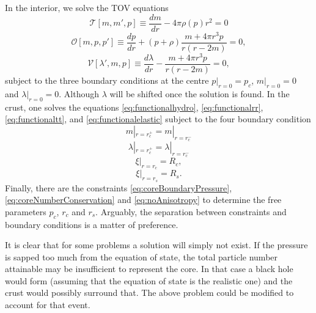 In the interior, we solve the TOV equations
\begin{equation}
\mathcal{T}[m,m',p] \equiv \frac{dm}{dr} - 4\pi\rho(p) r^2=0
\label{eq:tovrr}
\end{equation}
\begin{equation}
\mathcal{O}[m,p,p'] \equiv \frac{dp}{dr} + (p+\rho)\frac{m+4\pi r^3p}{r(r-2m)} = 0,
\label{eq:tovhydro}
\end{equation}
\begin{equation}
\mathcal{V}[\lambda',m,p] \equiv \frac{d\lambda}{dr} - \frac{m+4\pi r^3p}{r(r-2m)} = 0,
\label{eq:tovtt}
\end{equation}
subject to the three boundary conditions at the centre $p|_{r=0} = p_c$, $m|_{r=0}=0$ and $\lambda|_{r=0}=0$. Although $\lambda$ will be shifted once the solution is found. In the crust, one solves the equations \eqref{eq:functionalhydro}, \eqref{eq:functionalrr}, \eqref{eq:functionaltt}, and \eqref{eq:functionalelastic} subject to the four boundary condition 
\begin{equation}
m|_{r=r_c^+}=m|_{r=r_c^-}
\end{equation}
\begin{equation}\lambda|_{r=r_c^+}=\lambda|_{r=r_c^-}
\end{equation}
\begin{equation}
\xi|_{r=r_c}=R_c,
\end{equation}
\begin{equation}
\xi|_{r=r_s}=R_s.
\end{equation}
Finally, there are the constraints \eqref{eq:coreBoundaryPressure}, \eqref{eq:coreNumberConservation} and \eqref{eq:noAnisotropy} to determine the free parameters $p_c$, $r_c$ and $r_s$. Arguably, the separation between constraints and boundary conditions is a matter of preference.

It is clear that for some problems a solution will simply not exist. If the pressure is sapped too much from the equation of state, the total particle number attainable may be insufficient to represent the core. In that case a black hole would form (assuming that the equation of state is the realistic one) and the crust would possibly surround that. The above problem could be modified to account for that event.
